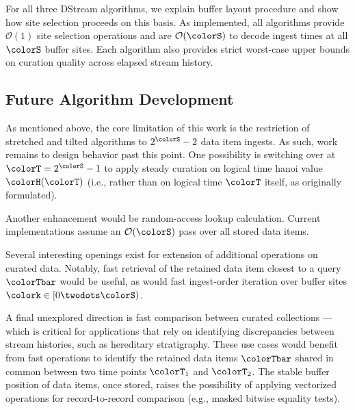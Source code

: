 For all three DStream algorithms, we explain buffer layout procedure and show how site selection proceeds on this basis.
As implemented, all algorithms provide $\mathcal{O}(1)$ site selection operations and are $\mathcal{O}(\colorS)$ to decode ingest times at all $\colorS$ buffer sites.
Each algorithm also provides strict worst-case upper bounds on curation quality across elapsed stream history.

\subsection{Future Algorithm Development}

As mentioned above, the core limitation of this work is the restriction of stretched and tilted algorithms to $2^{\colorS} - 2$ data item ingests.
As such, work remains to design behavior past this point.
One possibility is switching over at $\colorT = 2^{\colorS} - 1$ to apply steady curation on logical time hanoi value $\colorH(\colorT)$ (i.e., rather than on logical time $\colorT$ itself, as originally formulated).

Another enhancement would be random-access lookup calculation.
Current implementations assume an $\mathcal{O}(\colorS)$ pass over all stored data items.

Several interesting openings exist for extension of additional operations on curated data.
Notably, fast retrieval of the retained data item closest to a query $\colorTbar$ would be useful, as would fast ingest-order iteration over buffer sites $\colork \in [0 \twodots \colorS)$.

A final unexplored direction is fast comparison between curated collections --- which is critical for applications that rely on identifying discrepancies between stream histories, such as hereditary stratigraphy.
These use cases would benefit from fast operations to identify the retained data items $\colorTbar$ shared in common between two time points $\colorT_1$ and $\colorT_2$.
The stable buffer position of data items, once stored, raises the possibility of applying vectorized operations for record-to-record comparison (e.g., masked bitwise equality tests).



